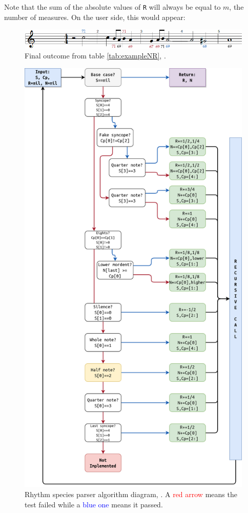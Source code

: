 Note that the sum of the absolute values of \texttt{R} will always be equal to $m$, the number of measures. On the user side, this would appear:

\begin{figure}[!h]
    \centering
    \includegraphics[width=5.2in]{Images/parser_example.png}
    \caption{Final outcome from table \ref{tab:exampleNR}, .}
    \label{fig:parseruser}
\end{figure}

\begin{figure}[]
    \includegraphics[scale=0.24, center]{Images/build_rhythmic_pattern.png}
    \caption{Rhythm species parser algorithm diagram, . A \textcolor{red}{red arrow} means the test failed while a \textcolor{blue}{blue one} means it passed.}
    \label{fig:rhythmdiagram}
\end{figure}